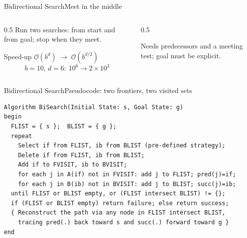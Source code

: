 \documentclass[aspectratio=169,11pt]{beamer}
\begin{document}
\begin{frame}{Bidirectional Search}{Meet in the middle}
  \begin{columns}[c]
    \begin{column}{0.5\textwidth}
      Run two searches:  from start and 
      from goal; stop when they meet.
      \vspace{0.4em}
      \begin{block}{Speed-up}
        \small
        $\mathcal{O}(b^{d}) \;\to\; \mathcal{O}\!\left(b^{d/2}\right)$
        \[ b{=}10,\, d{=}6:\ 10^{6} \to 2\times10^{3} \]
      \end{block}
    \end{column}
    \begin{column}{0.5\textwidth}
      \begin{center}
      \end{center}
      \centering\scriptsize
      Needs predecessors and a meeting test; goal must be explicit.
    \end{column}
  \end{columns}
\end{frame}

\begin{frame}[fragile]{Bidirectional Search}{Pseudocode: two frontiers, two visited sets}
\begin{lstlisting}[language={}, basicstyle=\ttfamily\tiny, numbers=none,
                   xleftmargin=0.5em, framexleftmargin=0.5em]
Algorithm BiSearch(Initial State: s, Goal State: g)
begin
  FLIST = { s };  BLIST = { g };
  repeat
    Select if from FLIST, ib from BLIST (pre-defined strategy);
    Delete if from FLIST, ib from BLIST;
    Add if to FVISIT, ib to BVISIT;
    for each j in A(if) not in FVISIT: add j to FLIST; pred(j)=if;
    for each j in B(ib) not in BVISIT: add j to BLIST; succ(j)=ib;
  until FLIST or BLIST empty, or (FLIST intersect BLIST) != {};
  if (FLIST or BLIST empty) return failure; else return success;
  { Reconstruct the path via any node in FLIST intersect BLIST,
    tracing pred(.) back toward s and succ(.) forward toward g }
end
\end{lstlisting}
\end{frame}
\end{document}
